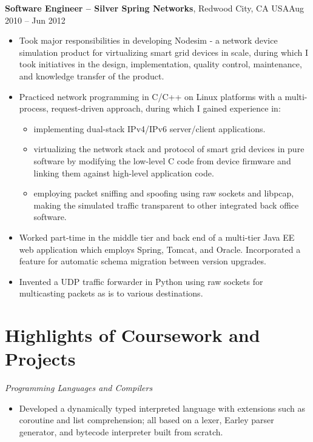 \documentclass[margin,line]{res}
\newcommand{\sstyle}{\sc}
\begin{document}
\begin{resume}
  {\bf Software Engineer -- Silver Spring Networks}, Redwood City, CA USA\hfill Aug 2010 -- Jun 2012
  \vspace{.05in}
  \begin{itemize}
  \item Took major responsibilities in developing Nodesim - a network device
        simulation product for virtualizing smart grid devices in scale,
        during which I took initiatives in the design, implementation,
        quality control, maintenance, and knowledge transfer of the product.
  \item Practiced network programming in C/C++ on Linux platforms with a
        multi-process, request-driven approach, during which I gained
        experience in:
        \begin{itemize}
        \item implementing dual-stack IPv4/IPv6 server/client applications.
        \item virtualizing the network stack and protocol of smart grid devices
              in pure software by modifying the low-level C code from device
              firmware and linking them against high-level application code.
        \item employing packet sniffing and spoofing using raw sockets and
              libpcap, making the simulated traffic transparent to other
              integrated back office software.
        \end{itemize}
  \item Worked part-time in the middle tier and back end of a multi-tier Java EE
        web application which employs Spring, Tomcat, and Oracle. Incorporated
        a feature for automatic schema migration between version upgrades.
  \item Invented a UDP traffic forwarder in Python using raw sockets for
        multicasting packets as is to various destinations.
  \end{itemize}

  \section{\sstyle Highlights of Coursework and Projects}
  {\sl Programming Languages and Compilers}
  \begin{itemize}
  \item Developed a dynamically typed interpreted language with extensions such
        as coroutine and list comprehension; all based on a lexer, Earley parser
        generator, and bytecode interpreter built from scratch.
  \end{itemize}


\end{resume}
\end{document}
